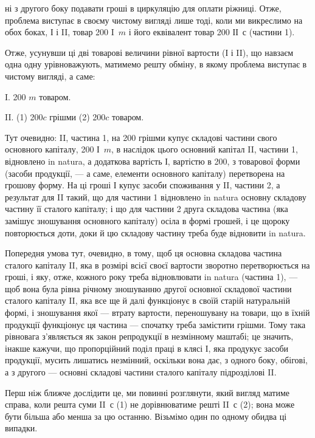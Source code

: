 \parcont{}  %
ні з другого боку подавати гроші в циркуляцію для оплати ріжниці.
Отже, проблема виступає в своєму чистому вигляді лише тоді, коли ми
викреслимо на обох боках, І і II, товар 200 I~$m$ і його еквівалент товар
200 ІІ~$с$ (частини 1).

Отже, усунувши ці дві товарові величини рівної вартости (І і II),
що навзаєм одна одну урівноважують, матимемо решту обміну, в якому
проблема виступає в чистому вигляді, а саме:

I. 200 $m$ товаром.

II. (1) 200$c$ грішми \dplus{} (2) 200$c$ товаром.

Тут очевидно: II, частина 1, на 200 грішми купує складові частини
свого основного капіталу, 200 І~$m$, в наслідок цього основний капітал II,
частини 1, відновлено in natura, а додаткова вартість І, вартістю в 200,
з товарової форми (засоби продукції, — а саме, елементи основного
капіталу) перетворена на грошову форму. На ці гроші І купує засоби
споживання у II, частини 2, а результат для II такий, що для частини 1
відновлено in natura основну складову частину її сталого капіталу; і що
для частини 2 друга складова частина (яка замішує зношування основного
капіталу) осіла в формі грошей, і це щороку повторюється доти,
доки й цю складову частину треба буде відновити in natura.

Попередня умова тут, очевидно, в тому, щоб ця основна складова частина
сталого капіталу II, яка в розмірі всієї своєї вартости зворотно перетворюється
на гроші, і яку, отже, кожного року треба відновлювати in natura
(частина 1), — щоб вона була рівна річному зношуванню другої основної
складової частини сталого капіталу II, яка все ще й далі функціонує в
своїй старій натуральній формі, і зношування якої — втрату вартости,
переношувану на товари, що в їхній продукції функціонує ця частина —
спочатку треба замістити грішми. Тому така рівновага з’являється як
закон репродукції в незмінному маштабі; це значить, інакше кажучи, що
пропорційний поділ праці в клясі І, яка продукує засоби продукції,
мусить лишатись незмінний, оскільки вона дає, з одного боку, обігові,
а з другого — основні складові частини сталого капіталу підрозділові II.

Перш ніж ближче дослідити це, ми повинні розглянути, який вигляд
матиме справа, коли решта суми II~$с$ (1) не дорівнюватиме решті II~$с$
(2); вона може бути більша або менша за цю останню. Візьмімо один
по одному обидва ці випадки.

